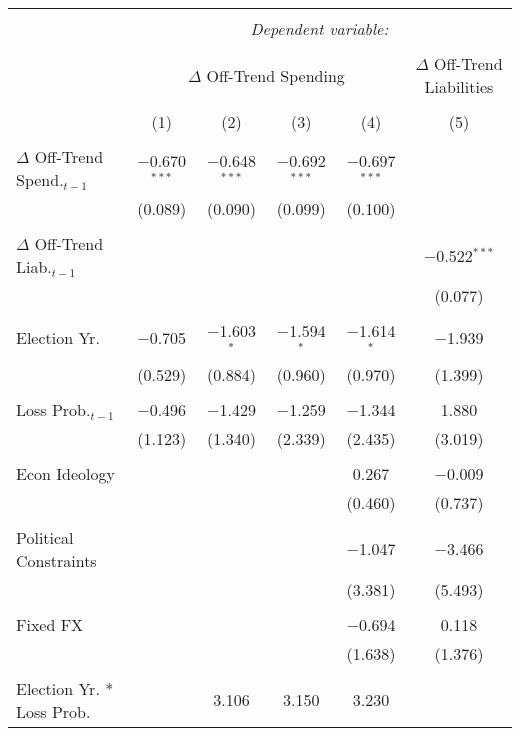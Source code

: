 
\begingroup 
\tiny 
\begin{tabular}{@{\extracolsep{5pt}}lccccc} 
\\[-1.8ex]\hline 
\hline \\[-1.8ex] 
 & \multicolumn{5}{c}{\textit{Dependent variable:}} \\ 
\cline{2-6} 
\\[-1.8ex] & \multicolumn{4}{c}{$\Delta$ Off-Trend Spending} & $\Delta$ Off-Trend Liabilities \\ 
\\[-1.8ex] & (1) & (2) & (3) & (4) & (5)\\ 
\hline \\[-1.8ex] 
 $\Delta$ Off-Trend Spend.$_{t-1}$ & $-$0.670$^{***}$ & $-$0.648$^{***}$ & $-$0.692$^{***}$ & $-$0.697$^{***}$ &  \\ 
  & (0.089) & (0.090) & (0.099) & (0.100) &  \\ 
  & & & & & \\ 
 $\Delta$ Off-Trend Liab.$_{t-1}$ &  &  &  &  & $-$0.522$^{***}$ \\ 
  &  &  &  &  & (0.077) \\ 
  & & & & & \\ 
 Election Yr. & $-$0.705 & $-$1.603$^{*}$ & $-$1.594$^{*}$ & $-$1.614$^{*}$ & $-$1.939 \\ 
  & (0.529) & (0.884) & (0.960) & (0.970) & (1.399) \\ 
  & & & & & \\ 
 Loss Prob.$_{t-1}$ & $-$0.496 & $-$1.429 & $-$1.259 & $-$1.344 & 1.880 \\ 
  & (1.123) & (1.340) & (2.339) & (2.435) & (3.019) \\ 
  & & & & & \\ 
 Econ Ideology &  &  &  & 0.267 & $-$0.009 \\ 
  &  &  &  & (0.460) & (0.737) \\ 
  & & & & & \\ 
 Political Constraints &  &  &  & $-$1.047 & $-$3.466 \\ 
  &  &  &  & (3.381) & (5.493) \\ 
  & & & & & \\ 
 Fixed FX &  &  &  & $-$0.694 & 0.118 \\ 
  &  &  &  & (1.638) & (1.376) \\ 
  & & & & & \\ 
 Election Yr. * Loss Prob. &  & 3.106 & 3.150 & 3.230 &  \\ 

\end{tabular}
